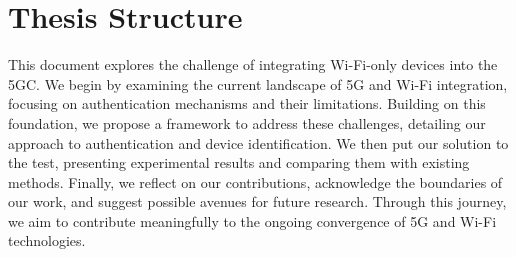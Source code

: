 \section{Thesis Structure}

This document explores the challenge of integrating Wi-Fi-only devices into the \ac{5GC}. We begin by examining the current landscape of \ac{5G} and Wi-Fi integration, focusing on authentication mechanisms and their limitations. Building on this foundation, we propose a framework to address these challenges, detailing our approach to authentication and device identification. We then put our solution to the test, presenting experimental results and comparing them with existing methods. Finally, we reflect on our contributions, acknowledge the boundaries of our work, and suggest possible avenues for future research. Through this journey, we aim to contribute meaningfully to the ongoing convergence of \ac{5G} and Wi-Fi technologies.